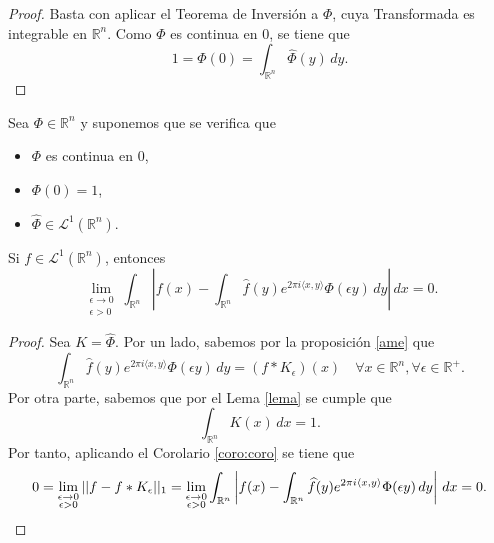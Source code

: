 \begin{proof}
    Basta con aplicar el Teorema de Inversión a $\Phi$, cuya Transformada es integrable en $\mathbb{R}^n$. Como $\Phi $ es continua en $0$, se tiene que 
    \begin{equation}
        1 = \Phi(0) = \int_{\mathbb{R}^n} \widehat{\Phi}(y) \, dy.
    \end{equation}
\end{proof}

\begin{teorema}\label{teoteo}
    Sea $\Phi \in \mathbb{R}^n$ y suponemos que se verifica que
    \begin{itemize}
         \item $\Phi$ es continua en $0$, 
    \item $\Phi(0) = 1$,
    \item $\widehat{\Phi} \in \mathscr{L}^1(\mathbb{R}^n).$
    \end{itemize}
    Si $f \in \mathscr{L}^1(\mathbb{R}^n)$, entonces
    \begin{equation}
        \lim_{\substack{\epsilon \rightarrow 0 \\ \epsilon > 0}} \int_{\mathbb{R}^n} \left| f(x) -   \int_{\mathbb{R}^n}\widehat{f}(y)e^{2\pi i \langle x, y \rangle} \Phi(\epsilon y) \, dy \right| \, dx = 0.
    \end{equation}
\end{teorema}
\begin{proof}
Sea $K = \widehat{\Phi}$. Por un lado, sabemos por la proposición \ref{ame}  que 
\begin{equation}\label{eq:c }
     \int_{\mathbb{R}^n}\widehat{f}(y)e^{2\pi i \langle x, y \rangle} \Phi(\epsilon y) \, dy  = (f*K_{\epsilon})(x) \quad \forall x \in \mathbb{R}^n, \forall \epsilon \in \mathbb{R}^+.
\end{equation}
\noindent Por otra parte, sabemos que por el Lema \ref{lema} se cumple que 
\begin{equation}
    \int_{\mathbb{R}^n} K(x) \, dx = 1.
\end{equation}
\noindent Por tanto, aplicando el Corolario \ref{coro:coro} se tiene que 
\begin{equation*}
    0 = \lim_{\substack{\epsilon \rightarrow 0 \\ \epsilon > 0}}||f-f*K_{\epsilon}||_1  = \lim_{\substack{\epsilon \rightarrow 0 \\ \epsilon > 0}} \int_{\mathbb{R}^n} \left| f(x) -   \int_{\mathbb{R}^n}\widehat{f}(y)e^{2\pi i \langle x, y \rangle} \Phi(\epsilon y) \, dy \right| \, dx = 0. \qedhere
\end{equation*}
\end{proof}
